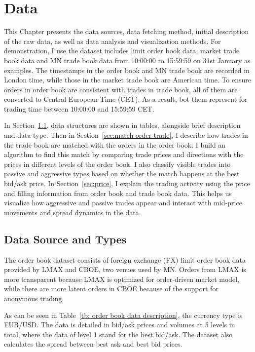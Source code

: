 \chapter{Data} \label{chapter:preliminary}
This Chapter presents the data sources, data fetching method, initial description of the raw data, as well as data analysis and visualization methods. For demonstration, I use the dataset includes limit order book data, market trade book data and MN trade book data from 10:00:00 to 15:59:59 on 31st January as examples. The timestamps in the order book and MN trade book are recorded in London time, while those in the market trade book are American time. To ensure orders in order book are consistent with trades in trade book, all of them are converted to Central European Time (CET). As a result, bot them represent for trading time between 10:00:00 and 15:59:59 CET. 

In Section~\ref{sec:data-source}, data structures are shown in tables, alongside brief description and data type. Then in Section~\ref{sec:match-order-trade}, I describe how trades in the trade book are matched with the orders in the order book. I build an algorithm to find this match by comparing trade prices and directions with the prices in different levels of the order book. I also classify visible trades into passive and aggressive types based on whether the match happens at the best bid/ask price. 
In Section~\ref{sec:price}, I explain the trading activity using the price and filling information from order book and trade book data. This helps us visualize how aggressive and passive trades appear and interact with mid-price movements and spread dynamics in the data. 


\section{Data Source and Types} \label{sec:data-source}
The order book dataset consists of foreign exchange (FX) limit order book data provided by LMAX and CBOE, two venues used by MN. Orders from LMAX is more transparent because LMAX is optimized for order-driven market model, while there are more latent orders in CBOE because of the support for anonymous trading. 

As can be seen in Table~\ref{tb: order book data description}, the currency type is EUR/USD. The data is detailed in bid/ask prices and volumes at 5 levels in total, where the data of level 1 stand for the best bid/ask. The dataset also calculates the spread between best ask and best bid prices.

